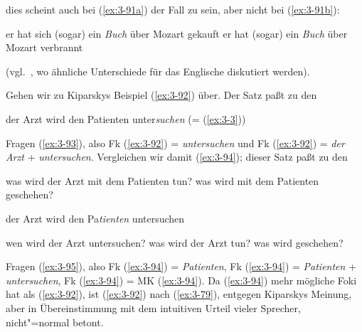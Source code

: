 \documentclass[output=paper]{langsci/langscibook}
\begin{document}
dies scheint auch bei (\ref{ex:3-91a}) der Fall zu sein, aber nicht bei (\ref{ex:3-91b}):
\begin{exe}
\ex
\label{ex:3-91}
\begin{xlist}
\ex
\label{ex:3-91a}
er hat sich (sogar) ein \textit{Buch} über Mozart gekauft
\ex
\label{ex:3-91b}
er hat (sogar) ein \textit{Buch} über Mozart verbrannt
\end{xlist}
\end{exe}
(vgl.\ \citet{Erteschick79b}, wo ähnliche Unterschiede für das Englische
diskutiert werden). 

Gehen wir zu Kiparskys Beispiel (\ref{ex:3-92}) über. Der
Satz paßt zu den
\begin{exe}
\ex
\label{ex:3-92}
der Arzt wird den Patienten unter\textit{suchen} (= (\ref{ex:3-3}))
\end{exe}
Fragen (\ref{ex:3-93}), also Fk (\ref{ex:3-92}) = \textit{untersuchen} und Fk (\ref{ex:3-92}) =
\textit{der Arzt} + \textit{untersuchen}. Vergleichen wir damit (\ref{ex:3-94});
dieser Satz paßt zu den 
\begin{exe}
\ex
\label{ex:3-93}
\begin{xlist}
\ex
\label{ex:3-93a}
was wird der Arzt mit dem Patienten tun?
\ex
\label{ex:3-93b}
was wird mit dem Patienten geschehen?
\end{xlist}
\ex
\label{ex:3-94}
der Arzt wird den Pa\textit{tienten} untersuchen
\ex
\label{ex:3-95}
\begin{xlist}
\ex
\label{ex:3-95a}
wen wird der Arzt untersuchen?
\ex
\label{ex:3-95b}
was wird der Arzt tun?
\ex
\label{ex:3-95c}
was wird geschehen?
\end{xlist}
\end{exe}
Fragen (\ref{ex:3-95}), also Fk (\ref{ex:3-94}) = \textit{Patienten}, Fk (\ref{ex:3-94}) =
\textit{Patienten} + \textit{untersuchen}, Fk (\ref{ex:3-94}) = MK (\ref{ex:3-94}). Da
(\ref{ex:3-94}) mehr mögliche Foki hat als (\ref{ex:3-92}), ist (\ref{ex:3-92}) nach (\ref{ex:3-79}), entgegen
Kiparskys Meinung, aber in Übereinstimmung mit dem intuitiven Urteil
vieler Sprecher, nicht"=normal betont.
\end{document}
